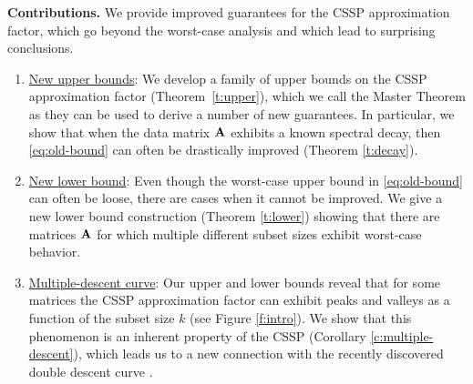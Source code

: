 \documentclass{article}
\begin{document}
\textbf{Contributions.} We provide improved guarantees for the CSSP
approximation factor, which go beyond the worst-case analysis and 
which lead to surprising conclusions.%
\begin{enumerate}
\item\underline{New upper bounds}:
We develop a family of upper bounds on the CSSP approximation factor
(Theorem~\ref{t:upper}), which we call the Master Theorem
as they can be used to derive a number 
of new guarantees. In particular, we show that when the data matrix $\mathbf A$ exhibits a
known spectral decay, then \eqref{eq:old-bound} can often be
drastically improved (Theorem \ref{t:decay}).
\item \underline{New lower bound}:
Even though the worst-case upper bound in \eqref{eq:old-bound} can often
be loose, there are cases when it cannot be improved.
We give a new lower bound construction (Theorem \ref{t:lower}) showing
that there are matrices $\mathbf A$ for which multiple different subset sizes exhibit
worst-case behavior.
\item \underline{Multiple-descent curve}: 
Our upper and lower bounds
reveal that for some matrices the CSSP approximation factor can exhibit
peaks and valleys as a function of the subset size $k$ (see Figure
\ref{f:intro}).  We show that this phenomenon is an inherent property
of the CSSP  (Corollary \ref{c:multiple-descent}), which
leads us to a new connection with the recently discovered double
descent curve \citep{BHMM19,surrogate-design}.
\end{enumerate}
\end{document}
